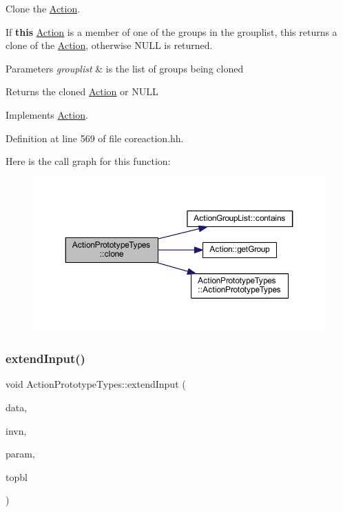 Clone the \mbox{\hyperlink{class_action}{Action}}. 

If {\bfseries{this}} \mbox{\hyperlink{class_action}{Action}} is a member of one of the groups in the grouplist, this returns a clone of the \mbox{\hyperlink{class_action}{Action}}, otherwise N\+U\+LL is returned. 
\begin{DoxyParams}{Parameters}
{\em grouplist} & is the list of groups being cloned \\
\hline
\end{DoxyParams}
\begin{DoxyReturn}{Returns}
the cloned \mbox{\hyperlink{class_action}{Action}} or N\+U\+LL 
\end{DoxyReturn}


Implements \mbox{\hyperlink{class_action_af8242e41d09e5df52f97df9e65cc626f}{Action}}.



Definition at line 569 of file coreaction.\+hh.

Here is the call graph for this function\+:
\nopagebreak
\begin{figure}[H]
\begin{center}
\leavevmode
\includegraphics[width=350pt]{class_action_prototype_types_aab34b0de3c657db76bef16ab5e2ac0dc_cgraph}
\end{center}
\end{figure}
\mbox{\label{class_action_prototype_types_ad501f68fdd5e2adec6bbb3d2f30fa462}} 
\subsubsection{\texorpdfstring{extendInput()}{extendInput()}}
{\footnotesize\ttfamily void Action\+Prototype\+Types\+::extend\+Input (\begin{DoxyParamCaption}\item[{\mbox{\hyperlink{class_funcdata}{Funcdata}} \&}]{data,  }\item[{\mbox{\hyperlink{class_varnode}{Varnode}} $\ast$}]{invn,  }\item[{\mbox{\hyperlink{class_proto_parameter}{Proto\+Parameter}} $\ast$}]{param,  }\item[{\mbox{\hyperlink{class_block_basic}{Block\+Basic}} $\ast$}]{topbl }\end{DoxyParamCaption})}



